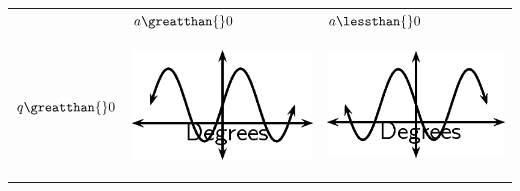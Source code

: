 \begin{center}
\label{m39414*uid46}
\noindent
{}
\tablelasttail{}
\begin{xtabular*}{\mytablewidth}[t]{|p{10\mystarwidth}|p{10\mystarwidth}|p{10\mystarwidth}|}\hline
&
    $a\greatthan{}0$
    &
    $a\lessthan{}0$
\tabularnewline{}
    $q\greatthan{}0$
    &
\setcounter{subfigure}{0}
\label{m39414*id85372}
\begin{center}
\label{m39414*id85372!!!underscore!!!media}\label{m39414*id85372!!!underscore!!!printimage}\includegraphics{col11306.imgs/m39414_MG10C15_019.png} %
\vspace{2pt}
\vspace{.1in}
\end{center}    
    &
\setcounter{subfigure}{0}
\label{m39414*id85384}
\begin{center}
\label{m39414*id85384!!!underscore!!!media}\label{m39414*id85384!!!underscore!!!printimage}\includegraphics{col11306.imgs/m39414_MG10C15_020.png} %

\end{center}
\end{xtabular*}
\end{center}
